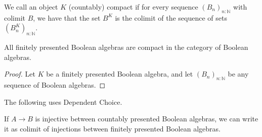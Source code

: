 


\begin{definition}
  We call an object $K$ (countably) compact if for every sequence 
  $(B_n)_{n:\mathbb N}$ with colimit $B$, we have
  that the set $B^K$ is the colimit of the sequence of sets $(B_n^K)_{n:\mathbb N}$.
\end{definition}

\begin{lemma}
  All finitely presented Boolean algebras are compact in the category of Boolean algebras. 
\end{lemma}  
\begin{proof}
  Let $K$ be a finitely presented Boolean algebra, 
  and let $(B_n)_{n:\mathbb N}$ be any sequence of Boolean algebras. 


\end{proof}

 The following uses Dependent Choice.

\begin{lemma}
  If $A \to B$ is injective between countably presented Boolean algebras, 
  we can write it as colimit of injections between finitely presented Boolean algebras. 
\end{lemma}
